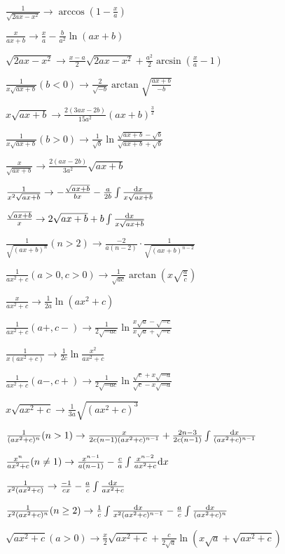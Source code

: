 $\frac{1}{\sqrt{2ax-x^2}} \to \arccos(1-\frac{x}{a})$\par
$\frac{x}{ax+b} \to \frac{x}{a}-\frac{b}{a^2}\ln(ax+b)$\par
$\sqrt{2ax-x^2} \to \frac{x-a}{2}\sqrt{2ax-x^2}+\frac{a^2}{2}\arcsin(\frac{x}{a}-1)$\par
$\frac{1}{x\sqrt{ax+b}}(b<0) \to \frac{2}{\sqrt{-b}}\arctan\sqrt{\frac{ax+b}{-b}}$\par
$x\sqrt{ax+b} \to \frac{2(3ax-2b)}{15a^2}(ax+b)^{\frac{3}{2}}$\par
$\frac{1}{x\sqrt{ax+b}}(b>0) \to \frac{1}{\sqrt{b}}\ln\frac{\sqrt{ax+b}-\sqrt{b}}{\sqrt{ax+b}+\sqrt{b}}$\par
$\frac{x}{\sqrt{ax+b}} \to \frac{2(ax-2b)}{3a^2}\sqrt{ax+b}$\par
$\frac{1}{x^2 \sqrt{ax+b}} \to -\frac{\sqrt{ax+b}}{bx}-\frac{a}{2b}\int\frac{\mathrm{d} x}{x\sqrt{ax+b}}$\par
$\frac{\sqrt{ax+b}}{x} \to 2\sqrt{ax+b}+b\int\frac{\mathrm{d} x}{x\sqrt{ax+b}}$\par
$\frac{1}{\sqrt{(ax+b)^n}}(n>2) \to \frac{-2}{a(n-2)}\cdot\frac{1}{\sqrt{(ax+b)^{n-2} }}$\par
$\frac{1}{ax^2+c}(a>0,c>0) \to \frac{1}{\sqrt{ac}}\arctan{(x\sqrt{\frac{a}{c}})}$\par
$\frac{x}{ax^2+c} \to \frac{1}{2a}\ln(ax^2+c)$\par
$\frac{1}{ax^2+c}(a+,c-) \to \frac{1}{2\sqrt{-ac}}\ln\frac{x\sqrt{a}-\sqrt{-c}}{x\sqrt{a}+\sqrt{-c}}$\par
$\frac{1}{x(ax^2+c)} \to \frac{1}{2c}\ln\frac{x^2}{ax^2+c}$\par
$\frac{1}{ax^2+c}(a-,c+) \to \frac{1}{2\sqrt{-ac}}\ln\frac{\sqrt{c}+x\sqrt{-a}}{\sqrt{c}-x\sqrt{-a}}$\par
$x{\sqrt{ax^2+c}} \to \frac{1}{3a}\sqrt{(ax^2+c)^3}$\par
$\frac{1}{(ax^2+c)^n}(n>1) \to \frac{x}{2c(n-1)(ax^2+c)^{n-1}}+\frac{2n-3}{2c(n-1)}\int\frac{\mathrm{d} x}{(ax^2+c)^{n-1}}$\par
$\frac{x^n}{ax^2+c}(n\ne 1)\to \frac{x^{n-1}}{a(n-1)}-\frac{c}{a}\int\frac{x^{n-2}}{ax^2+c}\mathrm{d} x$\par
$\frac{1}{x^2(ax^2+c)} \to \frac{-1}{cx}-\frac{a}{c}\int\frac{\mathrm{d} x}{ax^2+c}$\par
$\frac{1}{x^2(ax^2+c)^n}(n\ge 2) \to \frac{1}{c}\int\frac{\mathrm{d} x}{x^2(ax^2+c)^{n-1}}-\frac{a}{c}\int\frac{\mathrm{d} x}{(ax^2+c)^n}$\par
$\sqrt{ax^2+c}(a>0) \to \frac{x}{2}\sqrt{ax^2+c}+\frac{c}{2\sqrt{a}}\ln(x\sqrt{a}+\sqrt{ax^2+c})$\par
